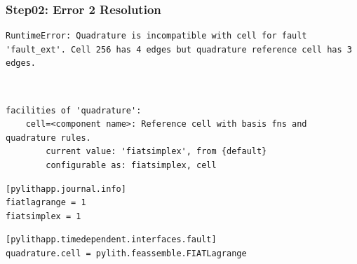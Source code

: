 \documentclass{beamer}
\begin{document}
\begin{frame}[fragile]
  \frametitle{Step02: Error 2 Resolution}

\begin{lstlisting}
RuntimeError: Quadrature is incompatible with cell for fault 'fault_ext'. Cell 256 has 4 edges but quadrature reference cell has 3 edges.
\end{lstlisting}\pause
{} \\
\begin{lstlisting}
facilities of 'quadrature':
    cell=<component name>: Reference cell with basis fns and quadrature rules.
        current value: 'fiatsimplex', from {default}
        configurable as: fiatsimplex, cell
\end{lstlisting}\pause
\begin{lstlisting}
[pylithapp.journal.info]
fiatlagrange = 1
fiatsimplex = 1
\end{lstlisting}
\begin{lstlisting}
[pylithapp.timedependent.interfaces.fault]
quadrature.cell = pylith.feassemble.FIATLagrange
\end{lstlisting}

\end{frame}
\end{document}
